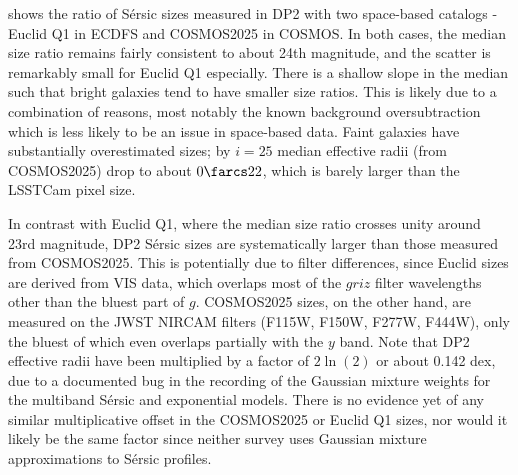  shows the ratio of S\'ersic sizes measured in DP2 with two space-based catalogs - Euclid Q1 in ECDFS and COSMOS2025 \citep[][]{2025A&A...704A.339S} in COSMOS.
In both cases, the median size ratio remains fairly consistent to about 24th magnitude, and the scatter is remarkably small for Euclid \gls{Q1} especially.
There is a shallow slope in the median such that bright galaxies tend to have smaller size ratios.
This is likely due to a combination of reasons, most notably the known \gls{background} oversubtraction which is less likely to be an issue in space-based data.
Faint galaxies have substantially overestimated sizes; by $i=25$ median effective radii (from COSMOS2025) drop to about $0\farcs22$, which is barely larger than the \gls{LSSTCam} pixel size.

In contrast with Euclid \gls{Q1}, where the median size ratio crosses unity around 23rd magnitude, DP2 S\'ersic sizes are systematically larger than those measured from COSMOS2025.
This is potentially due to filter differences, since Euclid sizes are derived from VIS data, which overlaps most of the $griz$ filter wavelengths other than the bluest part of $g$.
COSMOS2025 sizes, on the other hand, are measured on the \gls{JWST} NIRCAM filters (F115W, F150W, F277W, F444W), only the bluest of which even overlaps partially with the $y$ band.
Note that \gls{DP2} effective radii have been multiplied by a factor of $2\ln(2)$ or about 0.142 dex, due to a documented bug in the recording of the Gaussian mixture weights for the multiband S\'ersic and exponential models.
There is no evidence yet of any similar multiplicative offset in the COSMOS2025 or Euclid \gls{Q1} sizes, nor would it likely be the same factor since neither survey uses Gaussian mixture approximations to S\'ersic profiles.

